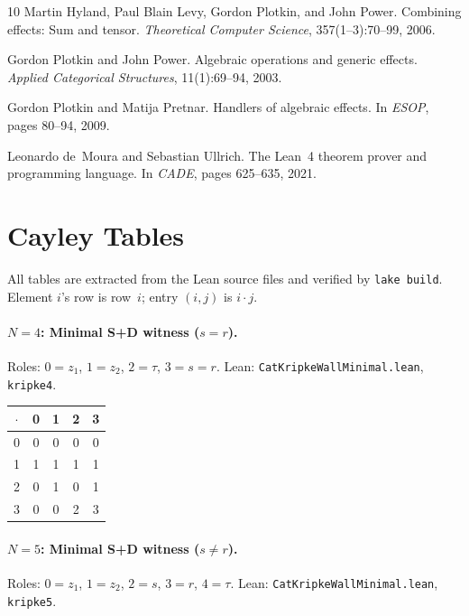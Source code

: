 \documentclass[sigconf,screen,review,anonymous]{acmart}
\newcommand{\dotop}{\cdot}
\begin{document}
\begin{thebibliography}{10}
Martin Hyland, Paul Blain Levy, Gordon Plotkin, and John Power.
\newblock Combining effects: Sum and tensor.
\newblock \emph{Theoretical Computer Science}, 357(1--3):70--99, 2006.

Gordon Plotkin and John Power.
\newblock Algebraic operations and generic effects.
\newblock \emph{Applied Categorical Structures}, 11(1):69--94, 2003.

Gordon Plotkin and Matija Pretnar.
\newblock Handlers of algebraic effects.
\newblock In \emph{ESOP}, pages 80--94, 2009.

Leonardo de~Moura and Sebastian Ullrich.
\newblock The {Lean}~4 theorem prover and programming language.
\newblock In \emph{CADE}, pages 625--635, 2021.

\end{thebibliography}

\appendix

\section{Cayley Tables}
\label{app:tables}

All tables are extracted from the Lean source files and verified by \texttt{lake build}. Element $i$'s row is row~$i$; entry $(i,j)$ is $i \dotop j$.

\paragraph{$N\!=\!4$: Minimal S+D witness ($s = r$).}
Roles: $0 = z_1$, $1 = z_2$, $2 = \tau$, $3 = s = r$. \quad Lean: \texttt{CatKripkeWallMinimal.lean}, \texttt{kripke4}.

\medskip
{\small
\begin{tabular}{c|cccc}
$\dotop$ & 0 & 1 & 2 & 3 \\\hline
0 & 0 & 0 & 0 & 0 \\
1 & 1 & 1 & 1 & 1 \\
2 & 0 & 1 & 0 & 1 \\
3 & 0 & 0 & 2 & 3 \\
\end{tabular}}

\paragraph{$N\!=\!5$: Minimal S+D witness ($s \neq r$).}
Roles: $0 = z_1$, $1 = z_2$, $2 = s$, $3 = r$, $4 = \tau$. \quad Lean: \texttt{CatKripkeWallMinimal.lean}, \texttt{kripke5}.
\end{document}
